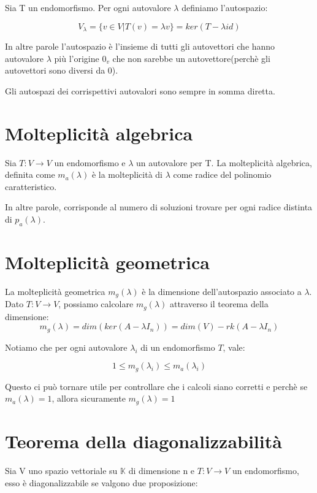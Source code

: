 \documentclass[a4paper, 10pt]{article}
\begin{document}
Sia T un endomorfismo. Per ogni autovalore $\lambda$ definiamo l'autospazio:

$$V_{\lambda}=\{v \in V | T(v) = \lambda v\} = ker(T-\lambda id)$$

In altre parole l'autospazio è l'insieme di tutti gli autovettori che hanno autovalore $\lambda$ più l'origine $0_v$ che non sarebbe un autovettore(perchè gli autovettori sono diversi da 0).

Gli autospazi dei corrispettivi autovalori sono sempre in somma diretta.


\section{Molteplicità algebrica}

Sia $T: V \rightarrow V$ un endomorfismo e $\lambda$ un autovalore per T. La molteplicità algebrica, definita come $m_a(\lambda)$ è la molteplicità di $\lambda$ come radice del polinomio caratteristico.

In altre parole, corrisponde al numero di soluzioni trovare per ogni radice distinta di $p_a(\lambda)$.

\section{Molteplicità geometrica}

La molteplicità geometrica $m_g(\lambda)$ è la dimensione dell'autospazio associato a $\lambda$. Dato $T: V \rightarrow V$, possiamo calcolare $m_g(\lambda)$ attraverso il teorema della dimensione: $$m_g(\lambda) = dim(ker(A-\lambda I_n)) = dim(V) - rk(A- \lambda I_n)$$

Notiamo che per ogni autovalore $\lambda_i$ di un endomorfismo $T$, vale:

$$1 \leq m_g(\lambda_i) \leq m_a(\lambda_i)$$

Questo ci può tornare utile per controllare che i calcoli siano corretti e perchè se $m_a(\lambda) = 1$, allora sicuramente $m_g(\lambda) = 1$

\section{Teorema della diagonalizzabilità}

Sia V uno spazio vettoriale su $\mathbb{K}$ di dimensione n e $T: V \rightarrow V$ un endomorfismo, esso è diagonalizzabile se valgono due proposizione:
\end{document}

